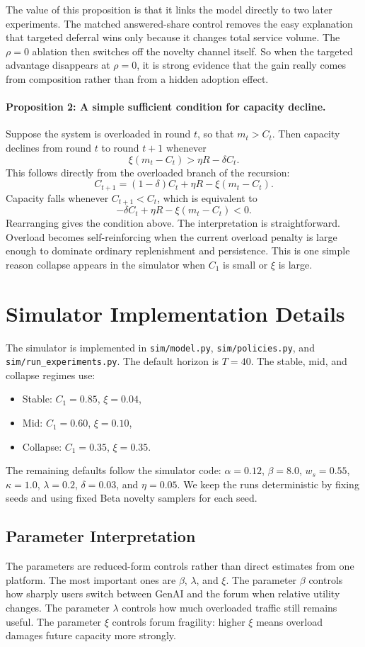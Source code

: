 \documentclass{article}
\begin{document}
The value of this proposition is that it links the model directly to two later experiments. The matched answered-share control removes the easy explanation that targeted deferral wins only because it changes total service volume. The $\rho=0$ ablation then switches off the novelty channel itself. So when the targeted advantage disappears at $\rho=0$, it is strong evidence that the gain really comes from composition rather than from a hidden adoption effect.

\paragraph{Proposition 2: A simple sufficient condition for capacity decline.}
Suppose the system is overloaded in round $t$, so that $m_t > C_t$. Then capacity declines from round $t$ to round $t+1$ whenever
\[
\xi (m_t - C_t) > \eta R - \delta C_t.
\]
This follows directly from the overloaded branch of the recursion:
\[
C_{t+1} = (1-\delta)C_t + \eta R - \xi (m_t-C_t).
\]
Capacity falls whenever $C_{t+1} < C_t$, which is equivalent to
\[
-\delta C_t + \eta R - \xi (m_t-C_t) < 0.
\]
Rearranging gives the condition above. The interpretation is straightforward. Overload becomes self-reinforcing when the current overload penalty is large enough to dominate ordinary replenishment and persistence. This is one simple reason collapse appears in the simulator when $C_1$ is small or $\xi$ is large.

\section{Simulator Implementation Details}
The simulator is implemented in \texttt{sim/model.py}, \texttt{sim/policies.py}, and \texttt{sim/run\_experiments.py}. The default horizon is $T=40$. The stable, mid, and collapse regimes use:
\begin{itemize}[leftmargin=1.5em]
\item Stable: $C_1=0.85$, $\xi=0.04$,
\item Mid: $C_1=0.60$, $\xi=0.10$,
\item Collapse: $C_1=0.35$, $\xi=0.35$.
\end{itemize}

The remaining defaults follow the simulator code: $\alpha=0.12$, $\beta=8.0$, $w_s=0.55$, $\kappa=1.0$, $\lambda=0.2$, $\delta=0.03$, and $\eta=0.05$. We keep the runs deterministic by fixing seeds and using fixed Beta novelty samplers for each seed.

\subsection{Parameter Interpretation}
The parameters are reduced-form controls rather than direct estimates from one platform. The most important ones are $\beta$, $\lambda$, and $\xi$. The parameter $\beta$ controls how sharply users switch between GenAI and the forum when relative utility changes. The parameter $\lambda$ controls how much overloaded traffic still remains useful. The parameter $\xi$ controls forum fragility: higher $\xi$ means overload damages future capacity more strongly.
\end{document}
